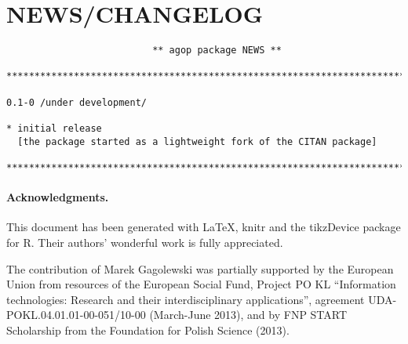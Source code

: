 \documentclass[11pt]{article}\usepackage{graphicx, color}
\makeatletter
\newenvironment{kframe}{%
 \def\at@end@of@kframe{}%
 \ifinner\ifhmode%
  \def\at@end@of@kframe{\end{minipage}}%
  \begin{minipage}{\columnwidth}%
 \fi\fi%
 \def\FrameCommand##1{\hskip\@totalleftmargin \hskip-\fboxsep
 \colorbox{shadecolor}{##1}\hskip-\fboxsep
     \hskip-\linewidth \hskip-\@totalleftmargin \hskip\columnwidth}%
 \MakeFramed {\advance\hsize-\width
   \@totalleftmargin\z@ \linewidth\hsize
   \@setminipage}}%
 {\par\unskip\endMakeFramed%
 \at@end@of@kframe}
\newenvironment{knitrout}{}{} %
\newcommand{\package}[1]{\textsf{#1}\xspace}
\newcommand{\lang}[1]{\textsf{#1}\xspace}
\newcommand{\R}{\lang{R}}
\theoremstyle{remark}
\theoremstyle{definition}
\makeatother
\begin{document}



\section{NEWS/CHANGELOG}

\begin{knitrout}\small
{}\color{fgcolor}\begin{kframe}
\begin{verbatim}
                          ** agop package NEWS **

***************************************************************************

0.1-0 /under development/

* initial release
  [the package started as a lightweight fork of the CITAN package]

***************************************************************************
\end{verbatim}
\end{kframe}
\end{knitrout}



\paragraph{Acknowledgments.}
This document has been generated with \LaTeX, \package{knitr} and
the \package{tikzDevice} package for \R.
Their authors' wonderful work is fully appreciated.


The contribution of Marek Gagolewski was partially supported
by the European Union from resources of the European Social Fund, Project PO KL 
``Information technologies: Research and their interdisciplinary
applications'', agreement UDA-POKL.04.01.01-00-051/10-00 (March-June 2013),
and by FNP START Scholarship from the Foundation for Polish Science (2013).





\end{document}
